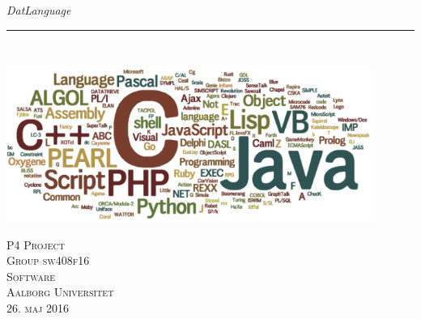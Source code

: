 \thispagestyle{empty}
\begin{flushright}
\vspace{3cm}

\phantom{hul}

\phantom{hul}

\phantom{hul}

\textsl{\Huge DatLanguage} \\ \vspace{1cm}

\rule{13cm}{3mm} \\ \vspace{1.5cm}
\vspace{1cm}

\includegraphics[width=0.9\textwidth]{billeder/Prog-languages}

\vspace{2cm} 
\textsc{\Large P4 Project \\
Group sw408f16 \\
Software\\
Aalborg Universitet\\
26. maj 2016\\}
\end{flushright}
